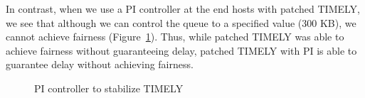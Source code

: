 In contrast, when we use a PI controller at the end hosts with patched
TIMELY, we see that although we can control the queue
to a specified value (300 KB), we cannot achieve fairness (Figure~\ref{fig:timely_pi}). 
Thus, while patched TIMELY was able to achieve fairness without guaranteeing
delay, patched TIMELY with PI is able to guarantee delay without
achieving fairness.
\begin{figure}
\center
{}
\vspace{-1em}
\caption{PI controller to stabilize TIMELY}
\vspace{-1em}
\label{fig:timely_pi}
\end{figure}

